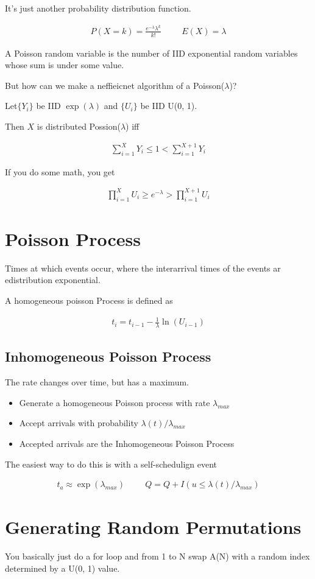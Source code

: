 \documentclass[fleqn]{report}
\newcommand{\hp}{\hspace{1cm}}
\newcommand{\equations} [1] {
\begin{gather*}
#1
\end{gather*}
}
\begin{document}
It's just another probability distribution function. 
\equations{
    P(X = k)
    =
    \frac{e^{- \lambda}
    \lambda^k }{k!}
    \hp 
    E(X) = \lambda 
}

A Poisson random variable is the number of IID exponential random 
variables whose sum is under some value. 


But how can we make a neffieicnet algorithm of a Poisson($\lambda$)?

Let$ \{ Y_i \}$ be IID $\exp(\lambda)$ and $\{ U_i \}$ be IID U(0, 1).

Then $X$ is distributed Possion($\lambda$) iff 
\equations{
    \sum_{i = 1}^X Y_i \leq 1 < \sum_{i = 1}^{X + 1} Y_i
}

If you do some math, you get 
\equations{
    \prod_{i = 1}^{X}
    U_i 
    \geq 
    e^{- \lambda}
    >
    \prod_{i = 1}^{X + 1}
    U_i 
}

\section{Poisson Process}
Times at which events occur, where the interarrival 
times of the events ar edistribution exponential. 

A homogeneous poisson Process is defined as 
\equations{
    t_i 
    =
    t_{i - 1}
    -
    \frac{1}{\lambda} 
    \ln(U_{i - 1})
}

\subsection{Inhomogeneous Poisson Process}
The rate changes over time, but has a maximum. 

\begin{itemize}
    \item 
    Generate a homogeneous Poisson process with rate $\lambda_{max}$
    \item 
    Accept arrivals with probability $\lambda(t) / \lambda_{max}$ 
    \item 
    Accepted arrivals are the Inhomogeneous Poisson Process 
\end{itemize}

The easiest way to do this is with a self-schedulign event 

\equations{
    t_a \approx \exp(\lambda_{max})
    \hp 
    Q = Q + I(u \leq \lambda(t) / \lambda_{max})
}

\section{Generating Random Permutations}
You basically just do a for loop and from 1 to N 
swap A(N) with a random index determined by a U(0, 1) value. 
\end{document}
